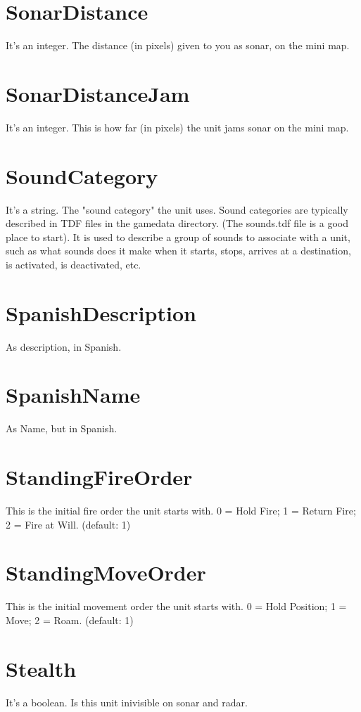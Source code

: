 \documentclass[a4paper,10pt]{article}
\begin{document}
\section{SonarDistance}
It's an integer. The distance (in pixels) given to you as sonar, on the mini map.

\section{SonarDistanceJam}
It's an integer. This is how far (in pixels) the unit jams sonar on the mini map.

\section{SoundCategory}
It's a string. The "sound category" the unit uses. Sound categories are typically described in TDF files in the gamedata directory. (The sounds.tdf file is a good place to start). It is used to describe a group of sounds to associate with a unit, such as what sounds does it make when it starts, stops, arrives at a destination, is activated, is deactivated, etc.

\section{SpanishDescription}
As description, in Spanish.

\section{SpanishName}
As Name, but in Spanish.

\section{StandingFireOrder}
This is the initial fire order the unit starts with.  0 = Hold Fire; 1 = Return Fire; 2 = Fire at Will. (default: 1)

\section{StandingMoveOrder}
This is the initial movement order the unit starts with.  0 = Hold Position; 1 = Move; 2 = Roam. (default: 1)

\section{Stealth}
It's a boolean. Is this unit inivisible on sonar and radar.
\end{document}
